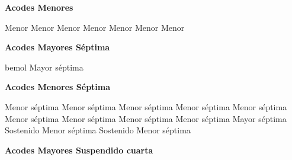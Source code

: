 \textbf{Acodes Menores}
\vskip 25pt

\small
{} Menor \qquad\qquad {} Menor \qquad\qquad {} Menor \qquad\qquad {} Menor \hfill \break
\vskip 25pt
 Menor \qquad\qquad {} Menor \qquad\qquad {} Menor
\vskip 25pt
  \qquad\qquad  {}  \qquad\qquad  {} \hfill \break
\vskip 25pt
 \qquad\qquad {}  \qquad\qquad  {}
\normalsize

\clearpage
\textbf{Acodes Mayores S\'eptima}
\vskip 25pt

\small
{} \qquad\qquad {} \qquad\qquad {} \qquad\qquad
\vskip 25pt
 \qquad\qquad {} \qquad\qquad {}
\vskip 25pt
  \qquad\qquad {} bemol Mayor s\'eptima
\vskip 25pt
 \qquad\qquad {} \qquad\qquad
\normalsize
\vskip 20pt

\textbf{Acodes Menores S\'eptima}
\vskip 25pt

\small
{} Menor s\'eptima \qquad\qquad
{} Menor s\'eptima \qquad\qquad
{} Menor s\'eptima
\vskip 25pt
 Menor s\'eptima \qquad\qquad
{} Menor s\'eptima \qquad\qquad
{} Menor s\'eptima
\vskip 25pt
 Menor s\'eptima \qquad\qquad
{} Menor s\'eptima \qquad\qquad
{} Menor s\'eptima
\vskip 25pt
 Mayor s\'eptima \qquad\qquad
{} Sostenido Menor s\'eptima \qquad\qquad
{} Sostenido Menor s\'eptima
\normalsize

\vskip 20pt

\textbf{Acodes Mayores Suspendido cuarta}
\vskip 25pt

